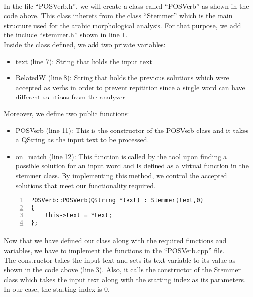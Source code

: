\documentclass{article}
\begin{document}
\paragraph{}
In the file ``POSVerb.h'', we will create a class called ``POSVerb'' as shown in the code above. This class inherets from the class ``Stemmer'' which is the main structure used for the arabic morphological analysis. For that purpose, we add the include ``stemmer.h'' shown in line 1.\\

Inside the class defined, we add two private variables:
\begin{itemize}
\item text (line 7): String that holds the input text
\item RelatedW (line 8): String that holds the previous solutions which were accepted as verbs in order to prevent repitition since a single word can have different solutions from the analyzer.
\end{itemize}

Moreover, we define two public functions:
\begin{itemize}
\item POSVerb (line 11): This is the constructor of the POSVerb class and it takes a QString as the input text to be processed.
\item on\_match (line 12): This function is called by the tool upon finding a possible solution for an input word and is defined as a virtual function in the stemmer class. By implementing this method, we control the accepted solutions that meet our functionality required.
\end{itemize}

\begin{Verbatim}[numbers=left]
POSVerb::POSVerb(QString *text) : Stemmer(text,0)
{
    this->text = *text;
};
\end{Verbatim}

\paragraph{}
Now that we have defined our class along with the required functions and variables, we have to implement the functions in the ``POSVerb.cpp'' file.\\
The constructor takes the input text and sets its text variable to its value as shown in the code above (line 3). Also, it calls the constructor of the Stemmer class which takes the input text along with the starting index as its parameters. In our case, the starting index is 0.
\end{document}
